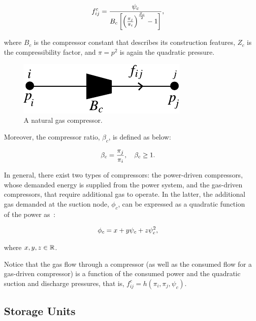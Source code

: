 \begin{equation}
	\label{eq:comp_flow}
	f_{ij}^c = \frac{\psi_c}{B_c \left[\left(\frac{\pi_j}{\pi_i}\right)^{\frac{Z_c}{2}}-1\right]},
	\vspace{0.3cm}
\end{equation}

where $B_c$ is the compressor constant that describes its construction features, $Z_c$ is the compressibility factor, and $\pi=p^2$ is again the quadratic pressure.

\begin{figure}[!ht]
	\centering
	\includegraphics[scale=0.9]{Figures/Compressor}
	\caption{A natural gas compressor.}	
	\label{fig:compressor}
\end{figure}

Moreover, the compressor ratio, $\beta_c$, is defined as below:

\begin{equation}
	\label{eq:comp_ratio}
	\beta_c = \frac{\pi_j}{\pi_i}, \quad \beta_c\geq 1.
	\vspace{0.3cm}
\end{equation}

In general, there exist two types of compressors: the power-driven compressors, whose demanded energy is supplied from the power system, and the gas-driven compressors, that require additional gas to operate. In the latter, the additional gas demanded at the suction node, $\phi_c$, can be expressed as a quadratic function of the power as~\cite{Chen2017}:

\begin{equation}
	\label{eq:f_cons_gas_comp}
	\phi_c = x+y\psi_c+z\psi_c^2, 
	\vspace{0.3cm}
\end{equation}

where $x,y,z \in \mathbb{R}$.

Notice that the gas flow through a compressor (as well as the consumed flow for a gas-driven compressor) is a function of the consumed power and the quadratic suction and discharge pressures, that is, $f_{ij}^c=h(\pi_i,\pi_j,\psi_c)$. 

\subsection{Storage Units}
\label{subsec:sto_units}

